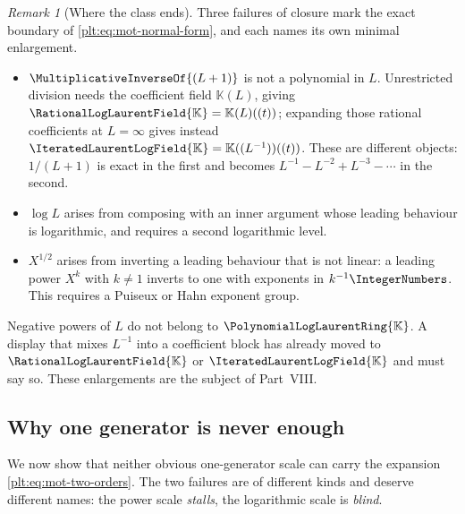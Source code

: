\documentclass[11pt,oneside]{article}
\theoremstyle{plain}
\theoremstyle{definition}
\theoremstyle{remark}
\newtheorem{remark}[theorem]{Remark}
\newcommand{\K}{\mathbb{K}}
\newcommand{\PLlau}{\PolynomialLogLaurentRing{\K}}       %
\newcommand{\PLrat}{\RationalLogLaurentField{\K}}        %
\newcommand{\PLit}{\IteratedLaurentLogField{\K}}         %
\begin{document}
\begin{remark}[Where the class ends]
\label{plt:rmk:mot-boundary}
Three failures of closure mark the exact boundary of
\eqref{plt:eq:mot-normal-form}, and each names its own minimal enlargement.
\begin{itemize}
\item \(\MultiplicativeInverseOf{(L+1)}\) is not a polynomial in \(L\).
  Unrestricted division needs the coefficient field \(\K(L)\), giving
  \(\PLrat=\K(L)((t))\); expanding those rational coefficients at
  \(L=\infty\) gives instead \(\PLit=\K((L^{-1}))((t))\).  These are different
  objects: \(1/(L+1)\) is exact in the first and becomes
  \(L^{-1}-L^{-2}+L^{-3}-\cdots\) in the second.
\item \(\log L\) arises from composing with an inner argument whose leading
  behaviour is logarithmic, and requires a second logarithmic level.
\item \(X^{1/2}\) arises from inverting a leading behaviour that is not
  linear: a leading power \(X^{k}\) with \(k\ne1\) inverts to one with
  exponents in \(k^{-1}\IntegerNumbers\).  This requires a Puiseux or Hahn
  exponent group.
\end{itemize}
Negative powers of \(L\) do not belong to \(\PLlau\).  A display that mixes
\(L^{-1}\) into a coefficient block has already moved to \(\PLrat\) or
\(\PLit\) and must say so.  These enlargements are the subject of Part~VIII.
\end{remark}

\subsection{Why one generator is never enough}
\label{plt:sec:mot-one-generator}

We now show that neither obvious one-generator scale can carry the expansion
\eqref{plt:eq:mot-two-orders}.  The two failures are of different kinds and
deserve different names: the power scale \emph{stalls}, the logarithmic scale
is \emph{blind}.
\end{document}
